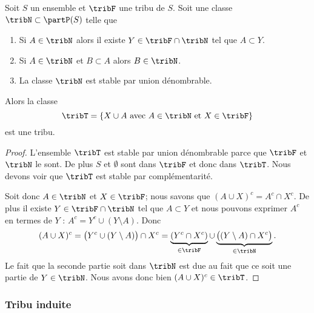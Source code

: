 \begin{proposition}  \label{PropHYLooLgOCy}
    Soit \( S\) un ensemble et \( \tribF\) une tribu de \( S\). Soit une classe \( \tribN\subset\partP(S)\) telle que
    \begin{enumerate}
        \item
            Si \( A\in\tribN\) alors il existe \( Y\in\tribF\cap\tribN\) tel que \( A\subset Y\).
        \item
            Si \( A\in\tribN\) et \( B\subset A\) alors \( B\in\tribN\).
        \item
            La classe \( \tribN\) est stable par union dénombrable.
    \end{enumerate}
    Alors la classe
    \begin{equation}
        \tribT=\{ X\cup A\text{ avec } A\in\tribN\text{ et } X\in\tribF \}
    \end{equation}
    est une tribu.
\end{proposition}

\begin{proof}
    L'ensemble \( \tribT\) est stable par union dénombrable parce que \( \tribF\) et \( \tribN\) le sont. De plus \( S\) et \( \emptyset\) sont dans \( \tribF\) et donc dans \( \tribT\). Nous devons voir que \( \tribT\) est stable par complémentarité.

    Soit donc \( A\in\tribN\) et \( X\in\tribF\); nous savons que \( (A\cup X)^c=A^c\cap X^c\). De plus il existe \( Y\in\tribF\cap\tribN\) tel que \( A\subset Y\) et nous pouvons exprimer \( A^c\) en termes de \( Y\) : \( A^c=Y^c\cup(Y\setminus A)\). Donc
    \begin{equation}
        (A\cup X)^c=\big( Y^c\cup(Y\setminus A) \big)\cap X^c=\underbrace{(Y^c\cap X^c)}_{\in\tribF}\cup\underbrace{\big( (Y\setminus A)\cap X^c \big)}_{\in\tribN}.
    \end{equation}
    Le fait que la seconde partie soit dans \( \tribN\) est due au fait que ce soit une partie de \( Y\in\tribN\). Nous avons donc bien \( (A\cup X)^c\in\tribT\).
\end{proof}

\subsubsection{Tribu induite}

